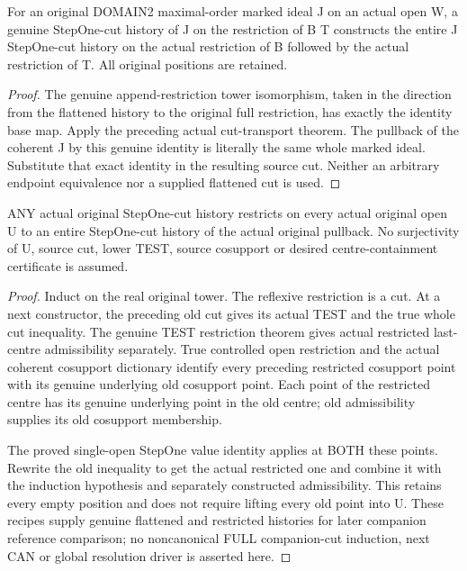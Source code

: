 \begin{theorem}
\label{hir:original-bound-two-stepone-cut-restrict-append}
\leanok
For an original DOMAIN2 maximal-order marked ideal J on an actual open W,
a genuine StepOne-cut history of J on the restriction of B T constructs
the entire J StepOne-cut history on the actual restriction of B followed
by the actual restriction of T. All original positions are retained.
\end{theorem}
\begin{proof}
The genuine append-restriction tower isomorphism, taken in the direction
from the flattened history to the original full restriction, has exactly
the identity base map. Apply the preceding actual cut-transport theorem.
The pullback of the coherent J by this genuine identity is literally the
same whole marked ideal. Substitute that exact identity in the resulting
source cut. Neither an arbitrary endpoint equivalence nor a supplied
flattened cut is used.
\end{proof}

\begin{theorem}
\label{hir:original-bound-two-stepone-cut-restrict-open}
\leanok
ANY actual original StepOne-cut history restricts on every actual original
open U to an entire StepOne-cut history of the actual original pullback.
No surjectivity of U, source cut, lower TEST, source cosupport or desired
centre-containment certificate is assumed.
\end{theorem}
\begin{proof}
Induct on the real original tower. The reflexive restriction is a cut.
At a next constructor, the preceding old cut gives its actual TEST and
the true whole cut inequality. The genuine TEST restriction theorem gives
actual restricted last-centre admissibility separately. True controlled
open restriction and the actual coherent cosupport dictionary identify
every preceding restricted cosupport point with its genuine underlying
old cosupport point. Each point of the restricted centre has its genuine
underlying point in the old centre; old admissibility supplies its old
cosupport membership.

The proved single-open StepOne value identity applies at BOTH these
points. Rewrite the old inequality to get the actual restricted one and
combine it with the induction hypothesis and separately constructed
admissibility. This retains every empty position and does not require
lifting every old point into U. These recipes supply genuine flattened
and restricted histories for later companion reference comparison; no
noncanonical FULL companion-cut induction, next CAN or global resolution
driver is asserted here.
\end{proof}
